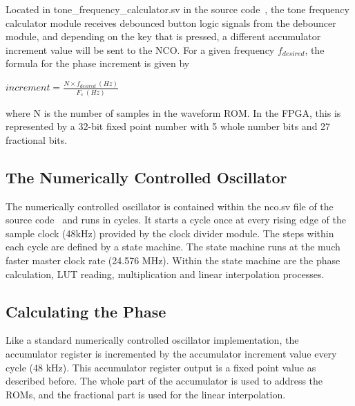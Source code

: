 \documentclass[conference]{IEEEtran}
\begin{document}
Located in tone\_frequency\_calculator.sv in the source code~\cite{github-release}, the tone frequency calculator module receives debounced button logic signals from the debouncer module, and depending on the key that is pressed, a different accumulator increment value will be sent to the NCO. For a given frequency $f_{desired}$, the formula for the phase increment is given by 
\begin{center}
    $increment = \frac{N\times f_{desired}\ (Hz)}{F_s\ (Hz)}$
\end{center}
where N is the number of samples in the waveform ROM. In the FPGA, this is represented by a 32-bit fixed point number with 5 whole number bits and 27 fractional bits.


\subsection{The Numerically Controlled Oscillator}
The numerically controlled oscillator is contained within the nco.sv file of the source code~\cite{github-release} and runs in cycles. It starts a cycle once at every rising edge of the sample clock (48kHz) provided by the clock divider module. The steps within each cycle are defined by a state machine. The state machine runs at the much faster master clock rate (24.576 MHz). Within the state machine are the phase calculation, LUT reading, multiplication and linear interpolation processes.



\subsection{Calculating the Phase}
Like a standard numerically controlled oscillator implementation, the accumulator register is incremented by the accumulator increment value every cycle (48 kHz). This accumulator register output is a fixed point value as described before. The whole part of the accumulator is used to address the ROMs, and the fractional part is used for the linear interpolation.

\end{document}

